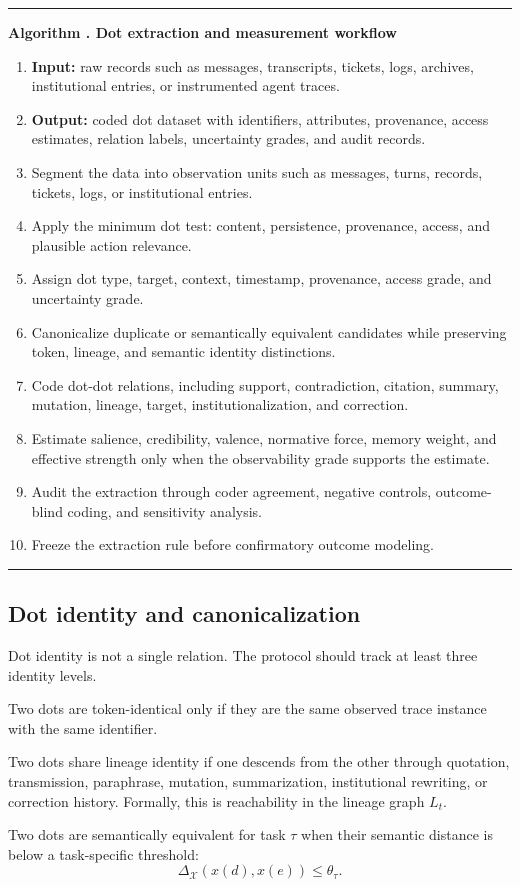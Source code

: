 \documentclass[11pt]{article}
\theoremstyle{remark}
\newcounter{algorithmbox}
\newenvironment{algorithmblock}[1]{%
\refstepcounter{algorithmbox}%
\par\medskip
\noindent\begin{minipage}{\linewidth}
\hrule\vspace{0.45em}
\textbf{Algorithm \thealgorithmbox. #1}\par\vspace{0.25em}
\begin{enumerate}[leftmargin=*,label=\arabic*.]
}{%
\end{enumerate}
\vspace{0.2em}\hrule
\end{minipage}\medskip
}
\begin{document}
\begin{algorithmblock}{Dot extraction and measurement workflow}
\label{alg:dot-extraction-workflow}
\item \textbf{Input:} raw records such as messages, transcripts, tickets, logs, archives, institutional entries, or instrumented agent traces.
\item \textbf{Output:} coded dot dataset with identifiers, attributes, provenance, access estimates, relation labels, uncertainty grades, and audit records.
\item Segment the data into observation units such as messages, turns, records, tickets, logs, or institutional entries.
\item Apply the minimum dot test: content, persistence, provenance, access, and plausible action relevance.
\item Assign dot type, target, context, timestamp, provenance, access grade, and uncertainty grade.
\item Canonicalize duplicate or semantically equivalent candidates while preserving token, lineage, and semantic identity distinctions.
\item Code dot-dot relations, including support, contradiction, citation, summary, mutation, lineage, target, institutionalization, and correction.
\item Estimate salience, credibility, valence, normative force, memory weight, and effective strength only when the observability grade supports the estimate.
\item Audit the extraction through coder agreement, negative controls, outcome-blind coding, and sensitivity analysis.
\item Freeze the extraction rule before confirmatory outcome modeling.
\end{algorithmblock}


\subsection{Dot identity and canonicalization}\label{dot-identity-canonicalization-protocol}

Dot identity is not a single relation. The protocol should track at least
three identity levels.

\begin{description}[leftmargin=3.2cm,style=nextline]
\item[Token identity]
Two dots are token-identical only if they are the same observed trace
instance with the same identifier.

\item[Lineage identity]
Two dots share lineage identity if one descends from the other through
quotation, transmission, paraphrase, mutation, summarization,
institutional rewriting, or correction history. Formally, this is
reachability in the lineage graph \(L_t\).

\item[Semantic identity]
Two dots are semantically equivalent for task \(\tau\) when their semantic
distance is below a task-specific threshold:
\[
\Delta_{\mathcal X}(x(d),x(e))\leq \theta_\tau.
\]
\end{description}
\end{document}
